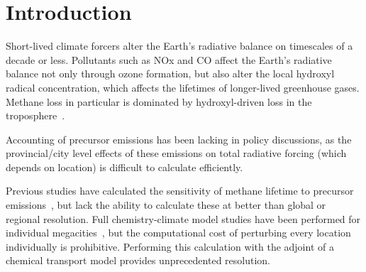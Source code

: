 \section{Introduction}

Short-lived climate forcers alter the Earth's radiative balance on timescales of a decade or less. Pollutants such as NOx and CO affect the Earth's radiative balance not only through ozone formation, but also alter the local hydroxyl radical concentration, which affects the lifetimes of longer-lived greenhouse gases. Methane loss in particular is dominated by hydroxyl-driven loss in the troposphere~\citep{ref:kirschke2013}.

Accounting of precursor emissions has been lacking in policy discussions, as the provincial/city level effects of these emissions on total radiative forcing (which depends on location) is difficult to calculate efficiently.

Previous studies have calculated the sensitivity of methane lifetime to precursor emissions~\citep{ref:holmes2013}, but lack the ability to calculate these at better than global or regional resolution. Full chemistry-climate model studies have been performed for individual megacities~\citep{ref:dang2015}, but the computational cost of perturbing every location individually is prohibitive. Performing this calculation with the adjoint of a chemical transport model provides unprecedented resolution.